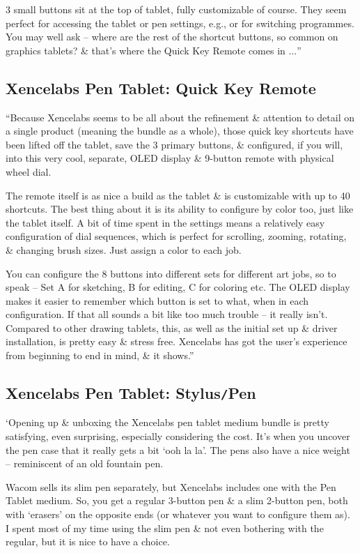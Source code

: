 \documentclass[oneside]{book}
\numberwithin{equation}{section}
\begin{document}
3 small buttons sit at the top of tablet, fully customizable of course. They seem perfect for accessing the tablet or pen settings, e.g., or for switching programmes. You may well ask -- where are the rest of the shortcut buttons, so common on graphics tablets? \& that's where the Quick Key Remote comes in $\ldots$''

\subsection{Xencelabs Pen Tablet: Quick Key Remote}
``Because Xencelabs seems to be all about the refinement \& attention to detail on a single product (meaning the bundle as a whole), those quick key shortcuts have been lifted off the tablet, save the 3 primary buttons, \& configured, if you will, into this very cool, separate,  OLED display \& 9-button remote with physical wheel dial.

The remote itself is as nice a build as the tablet \& is customizable with up to 40 shortcuts. The best thing about it is its ability to configure by color too, just like the tablet itself. A bit of time spent in the settings means a relatively easy configuration of dial sequences, which is perfect for scrolling, zooming, rotating, \& changing brush sizes. Just assign a color to each job.

You can configure the 8 buttons into different sets for different art jobs, so to speak -- Set A for sketching, B for editing, C for coloring etc. The OLED display makes it easier to remember which button is set to what, when in each configuration. If that all sounds a bit like too much trouble -- it really isn't. Compared to other drawing tablets, this, as well as the initial set up \& driver installation, is pretty easy \& stress free. Xencelabs has got the user's experience from beginning to end in mind, \& it shows.''

\subsection{Xencelabs Pen Tablet: Stylus\texttt{/}Pen}
`Opening up \& unboxing the Xencelabs pen tablet medium bundle is pretty satisfying, even surprising, especially considering the cost. It's when you uncover the pen case that it really gets a bit `ooh la la'. The pens also have a nice weight -- reminiscent of an old fountain pen.

Wacom sells its slim pen separately, but Xencelabs includes one with the Pen Tablet medium. So, you get a regular 3-button pen \& a slim 2-button pen, both with `erasers' on the opposite ends (or whatever you want to configure them as). I spent most of my time using the slim pen \& not even bothering with the regular, but it is nice to have a choice.
\end{document}
